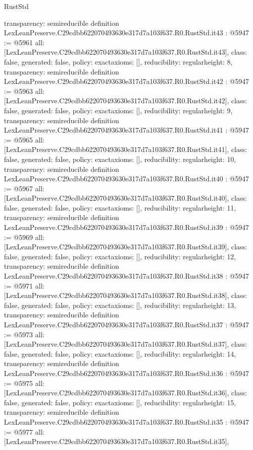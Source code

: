 \begin{lexlean}{RustStd}
\begin{coremodule}
{  transparency: semireducible
}
definition LexLeanPreserve.C29cdbb622070493630e317d7a103f637.R0.RustStd.it43 : @5947 := @5961 {
  all: [LexLeanPreserve.C29cdbb622070493630e317d7a103f637.R0.RustStd.it43],
  class: false,
  generated: false,
  policy: exact{axioms: []},
  reducibility: regular{height: 8},
  transparency: semireducible
}
definition LexLeanPreserve.C29cdbb622070493630e317d7a103f637.R0.RustStd.it42 : @5947 := @5963 {
  all: [LexLeanPreserve.C29cdbb622070493630e317d7a103f637.R0.RustStd.it42],
  class: false,
  generated: false,
  policy: exact{axioms: []},
  reducibility: regular{height: 9},
  transparency: semireducible
}
definition LexLeanPreserve.C29cdbb622070493630e317d7a103f637.R0.RustStd.it41 : @5947 := @5965 {
  all: [LexLeanPreserve.C29cdbb622070493630e317d7a103f637.R0.RustStd.it41],
  class: false,
  generated: false,
  policy: exact{axioms: []},
  reducibility: regular{height: 10},
  transparency: semireducible
}
definition LexLeanPreserve.C29cdbb622070493630e317d7a103f637.R0.RustStd.it40 : @5947 := @5967 {
  all: [LexLeanPreserve.C29cdbb622070493630e317d7a103f637.R0.RustStd.it40],
  class: false,
  generated: false,
  policy: exact{axioms: []},
  reducibility: regular{height: 11},
  transparency: semireducible
}
definition LexLeanPreserve.C29cdbb622070493630e317d7a103f637.R0.RustStd.it39 : @5947 := @5969 {
  all: [LexLeanPreserve.C29cdbb622070493630e317d7a103f637.R0.RustStd.it39],
  class: false,
  generated: false,
  policy: exact{axioms: []},
  reducibility: regular{height: 12},
  transparency: semireducible
}
definition LexLeanPreserve.C29cdbb622070493630e317d7a103f637.R0.RustStd.it38 : @5947 := @5971 {
  all: [LexLeanPreserve.C29cdbb622070493630e317d7a103f637.R0.RustStd.it38],
  class: false,
  generated: false,
  policy: exact{axioms: []},
  reducibility: regular{height: 13},
  transparency: semireducible
}
definition LexLeanPreserve.C29cdbb622070493630e317d7a103f637.R0.RustStd.it37 : @5947 := @5973 {
  all: [LexLeanPreserve.C29cdbb622070493630e317d7a103f637.R0.RustStd.it37],
  class: false,
  generated: false,
  policy: exact{axioms: []},
  reducibility: regular{height: 14},
  transparency: semireducible
}
definition LexLeanPreserve.C29cdbb622070493630e317d7a103f637.R0.RustStd.it36 : @5947 := @5975 {
  all: [LexLeanPreserve.C29cdbb622070493630e317d7a103f637.R0.RustStd.it36],
  class: false,
  generated: false,
  policy: exact{axioms: []},
  reducibility: regular{height: 15},
  transparency: semireducible
}
definition LexLeanPreserve.C29cdbb622070493630e317d7a103f637.R0.RustStd.it35 : @5947 := @5977 {
  all: [LexLeanPreserve.C29cdbb622070493630e317d7a103f637.R0.RustStd.it35],
}
\end{coremodule}
\end{lexlean}
